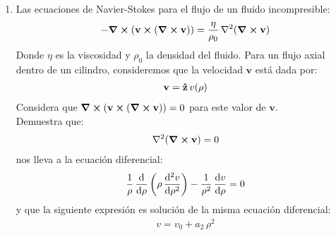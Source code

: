 \documentclass[12pt]{article}
\begin{document}
\begin{enumerate}
\item Las ecuaciones de Navier-Stokes para el flujo de un fluido incompresible:
\begin{align*}
- \curl{( \mathbf{v} \cp (\curl{\vb{v}}))} =  \dfrac{\eta}{\rho_{0}} \, \laplacian{(\curl{\vb{v}})}
\end{align*}
Donde $\eta$ es la viscosidad y $\rho_{0}$ la densidad del fluido. Para un flujo axial dentro de un cilindro, consideremos que la velocidad $\mathbf{v}$ está dada por:
\begin{align*}
\mathbf{v} =  \vu{z} \, v (\rho)
\end{align*}
Considera que $\curl{( \mathbf{v} \cp (\curl{\vb{v}}))} = 0$ para este valor de $\mathbf{v}$.
\\
Demuestra que:
\begin{align*}
\laplacian{( \curl{\vb{v}} )} = 0
\end{align*}
nos lleva a la ecuación diferencial:
\begin{align*}
\dfrac{1}{\rho} \, \dv{\rho} \left( \rho \, \dv[2]{v}{\rho} \right) -  \dfrac{1}{\rho^{2}} \, \dv{v}{\rho} = 0
\end{align*}
y que la siguiente expresión es solución de la misma ecuación diferencial:
\begin{align*}
v = v_{0} + a_{2} \, \rho^{2}
\end{align*}

\end{enumerate}
\end{document}
